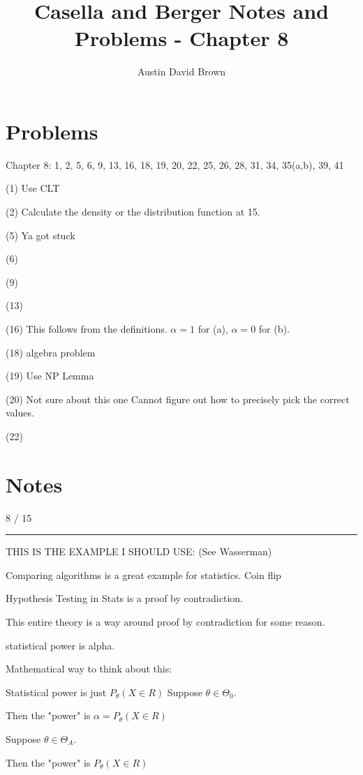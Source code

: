 \documentclass[12pt, reqno]{amsart}
\numberwithin{equation}{section}
\begin{document}
\title{Casella and Berger Notes and Problems -  Chapter 8}
\author{Austin David Brown}
\maketitle

\section{Problems}

Chapter 8: 1, 2, 5, 6, 9, 13, 16, 18, 19, 20, 22, 25, 26, 28, 31, 34, 35(a,b), 39, 41

(1)
Use CLT

(2)
Calculate the density or the distribution function at 15.

(5)
Ya got stuck

(6)

(9)

(13)

(16)
This follows from the definitions. $\alpha = 1$ for (a), $\alpha = 0$ for (b).

(18)
algebra problem

(19)
Use NP Lemma

(20)
Not sure about this one
Cannot figure out how to precisely pick the correct values.

(22)




\section{Notes}

8 / 15
\rule{\textwidth}{.5pt}

THIS IS THE EXAMPLE I SHOULD USE: (See Wasserman)

Comparing algorithms is a great example for statistics.
Coin flip

Hypothesis Testing in Stats is a proof by contradiction.

This entire theory is a way around proof by contradiction for some reason.

statistical power is alpha.

Mathematical way to think about this:

Statistical power is just $P_\theta(X \in R)$
Suppose $\theta \in \Theta_0.$

Then the "power" is $\alpha = P_\theta(X \in R)$

Suppose $\theta \in \Theta_A.$

Then the "power" is $P_\theta(X \in R)$
\end{document}
